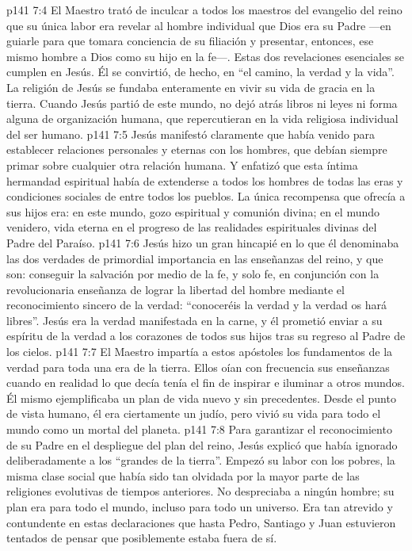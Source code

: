 \vs p141 7:4 El Maestro trató de inculcar a todos los maestros del evangelio del reino que su única labor era revelar al hombre individual que Dios era su Padre ---en guiarle para que tomara conciencia de su filiación y presentar, entonces, ese mismo hombre a Dios como su hijo en la fe---. Estas dos revelaciones esenciales se cumplen en Jesús. Él se convirtió, de hecho, en “el camino, la verdad y la vida”. La religión de Jesús se fundaba enteramente en vivir su vida de gracia en la tierra. Cuando Jesús partió de este mundo, no dejó atrás libros ni leyes ni forma alguna de organización humana, que repercutieran en la vida religiosa individual del ser humano.
\vs p141 7:5 Jesús manifestó claramente que había venido para establecer relaciones personales y eternas con los hombres, que debían siempre primar sobre cualquier otra relación humana. Y enfatizó que esta íntima hermandad espiritual había de extenderse a todos los hombres de todas las eras y condiciones sociales de entre todos los pueblos. La única recompensa que ofrecía a sus hijos era: en este mundo, gozo espiritual y comunión divina; en el mundo venidero, vida eterna en el progreso de las realidades espirituales divinas del Padre del Paraíso.
\vs p141 7:6 Jesús hizo un gran hincapié en lo que él denominaba las dos verdades de primordial importancia en las enseñanzas del reino, y que son: conseguir la salvación por medio de la fe, y solo fe, en conjunción con la revolucionaria enseñanza de lograr la libertad del hombre mediante el reconocimiento sincero de la verdad: “conoceréis la verdad y la verdad os hará libres”. Jesús era la verdad manifestada en la carne, y él prometió enviar a su espíritu de la verdad a los corazones de todos sus hijos tras su regreso al Padre de los cielos.
\vs p141 7:7 El Maestro impartía a estos apóstoles los fundamentos de la verdad para toda una era de la tierra. Ellos oían con frecuencia sus enseñanzas cuando en realidad lo que decía tenía el fin de inspirar e iluminar a otros mundos. Él mismo ejemplificaba un plan de vida nuevo y sin precedentes. Desde el punto de vista humano, él era ciertamente un judío, pero vivió su vida para todo el mundo como un mortal del planeta.
\vs p141 7:8 Para garantizar el reconocimiento de su Padre en el despliegue del plan del reino, Jesús explicó que había ignorado deliberadamente a los “grandes de la tierra”. Empezó su labor con los pobres, la misma clase social que había sido tan olvidada por la mayor parte de las religiones evolutivas de tiempos anteriores. No despreciaba a ningún hombre; su plan era para todo el mundo, incluso para todo un universo. Era tan atrevido y contundente en estas declaraciones que hasta Pedro, Santiago y Juan estuvieron tentados de pensar que posiblemente estaba fuera de sí.
